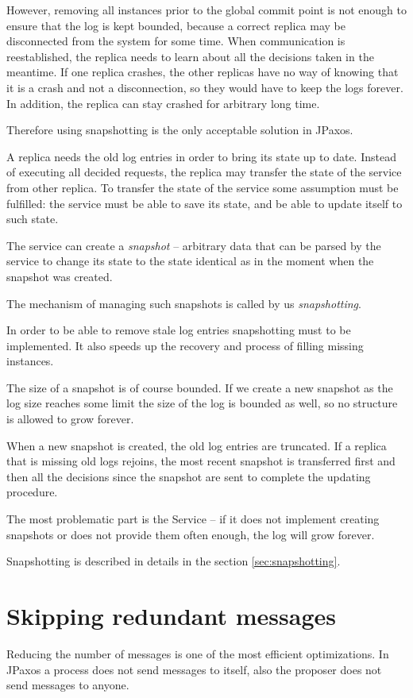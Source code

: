 However, removing all instances prior to the global commit point is not enough to ensure that the log is kept bounded, because a correct replica may be disconnected from the system for some time. When communication is reestablished, the replica needs to learn about all the decisions taken in the meantime. If one replica crashes, the other replicas have no way of knowing that it is a crash and not a disconnection, so they would have to keep the logs forever. In addition, the replica can stay crashed for arbitrary long time.

Therefore using snapshotting is the only acceptable solution in JPaxos.


A replica needs the old log entries in order to bring its state up to date. Instead of executing all decided requests, the replica may transfer the state of the service from other replica. To transfer the state of the service some assumption must be fulfilled: the service must be able to save its state, and be able to update itself to such state.

The service can create a \textit{snapshot} -- arbitrary data that can be parsed by the service to change its state to the state identical as in the moment when the snapshot was created.

The mechanism of managing such snapshots is called by us \textit{snapshotting}.

In order to be able to remove stale log entries snapshotting must to be implemented. It also speeds up the recovery and process of filling missing instances.

The size of a snapshot is of course bounded. If we create a new snapshot as the log size reaches some limit the size of the log is bounded as well, so no structure is allowed to grow forever.

When a new snapshot is created, the old log entries are truncated. If a replica that is missing old logs rejoins, the most recent snapshot is transferred first and then all the decisions since the snapshot are sent to complete the updating procedure.

The most problematic part is the Service -- if it does not implement creating snapshots or does not provide them often enough, the log will grow forever.

Snapshotting is described in details in the section \ref{sec:snapshotting}.

\section{Skipping redundant messages}
Reducing the number of messages is one of the most efficient optimizations. In JPaxos a process does not send messages to itself, also the proposer does not send \accept messages to anyone.

